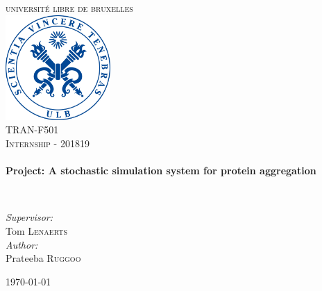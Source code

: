 \begin{titlepage}
\begin{center}

\textsc{\LARGE universit\'e libre de bruxelles}\\[2.5cm]

\includegraphics[width=0.3\textwidth]{Images/ulblogo.jpg}~\\[1cm]

\textsc{\Large  TRAN-F501 \\[0.3cm] Internship - 201819 }\\[0.5cm]

\HRule \\[0.6cm]
{ \huge \bfseries Project:
A stochastic simulation system for protein aggregation \\[0.6cm] }

\HRule \\[2cm]


\begin{center} \large
\emph{Supervisor:} \\
Tom \textsc{Lenaerts}\\


\emph{Author:}\\
Prateeba\textsc{ Ruggoo}\\
\end{center}

\vfill

{\large \today}

\end{center}
\end{titlepage}
